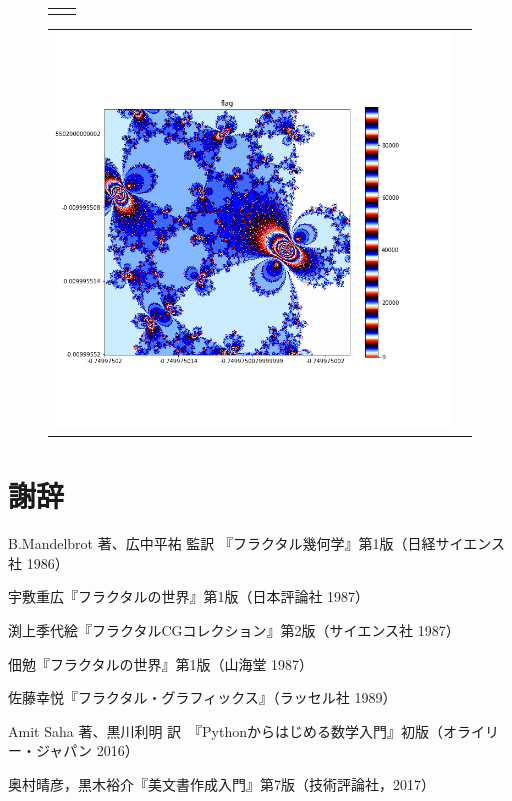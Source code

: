 \documentclass[uplatex,a4paper,11pt,oneside,openany]{jsbook}
\begin{document}
\begin{figure}[H]
\begin{tabular}{cc}
\begin{minipage}{0.5\hsize}
    \end{minipage}
  \end{tabular}
  \begin{tabular}{cc}
    \begin{minipage}{0.5\hsize}
      \centering
      \includegraphics[clip,scale=0.3]{../src/figure/fig005.png}
    \end{minipage}
    \begin{minipage}{0.5\hsize}
      \centering
    \end{minipage}
  \end{tabular}
\end{figure}%

%
\section*{謝辞}
%
\begin{thebibliography}{99}
  \item B.Mandelbrot 著、広中平祐 監訳 『フラクタル幾何学』第1版（日経サイエンス社 1986）
  \item 宇敷重広『フラクタルの世界』第1版（日本評論社 1987）
  \item 渕上季代絵『フラクタルCGコレクション』第2版（サイエンス社 1987）
  \item 佃勉『フラクタルの世界』第1版（山海堂 1987）
  \item 佐藤幸悦『フラクタル・グラフィックス』（ラッセル社 1989）
  \item Amit Saha 著、黒川利明 訳　『Pythonからはじめる数学入門』初版（オライリー・ジャパン 2016）
  \item 奥村晴彦，黒木裕介『\LaTeXe 美文書作成入門』第7版（技術評論社，2017）
\end{thebibliography}
%
\end{document}
